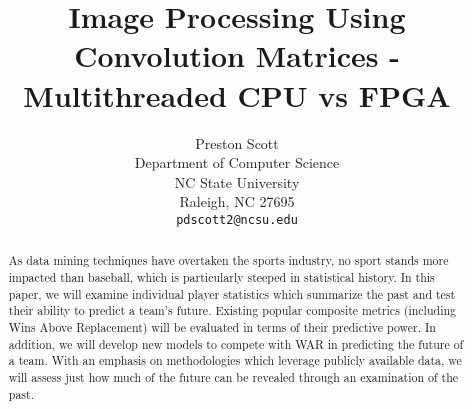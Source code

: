 \documentclass{article} %
\title{Image Processing Using Convolution Matrices - Multithreaded CPU vs FPGA}
\author{
Preston Scott\\
Department of Computer Science\\
NC State University\\
Raleigh, NC 27695 \\
\texttt{pdscott2@ncsu.edu} \\
}
\begin{document}
\maketitle

\begin{abstract}
As data mining techniques have overtaken the sports industry, no sport stands more impacted than baseball, which is particularly steeped in statistical history.  In this paper, we will examine individual player statistics which summarize the past and test their ability to predict a team's future.  Existing popular composite metrics (including Wins Above Replacement) will be evaluated in terms of their predictive power.  In addition, we will develop new models to compete with WAR in predicting the future of a team.  With an emphasis on methodologies which leverage publicly available data, we will assess just how much of the future can be revealed through an examination of the past.

\end{abstract}
\end{document}
